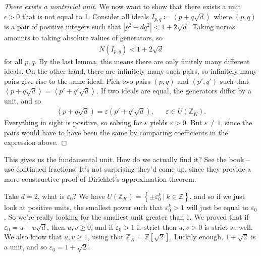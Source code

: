 \begin{proof}[There exists a nontrivial unit]

We now want to show that there exists a unit \(\epsilon>0\) that is not
equal to 1. Consider all ideals
\(I_{p, q} \coloneqq\left\langle{ p + q \sqrt{d} }\right\rangle\) where
\((p, q)\) is a pair of positive integers such that
\({\left\lvert {p^2 - dq^2} \right\rvert} < 1 + 2 \sqrt{d}\). Taking
norms amounts to taking absolute values of generators, so
\begin{align*}
N(I_{p, q} ) < 1 + 2 \sqrt{d}
\end{align*}
for all \(p, q\). By the last lemma, this means there are only finitely
many different ideals. On the other hand, there are infinitely many such
pairs, so infinitely many pairs give rise to the same ideal. Pick two
pairs \((p, q)\) and \((p', q')\) such that
\(\left\langle{ p + q \sqrt{d} }\right\rangle = \left\langle{ p' + q' \sqrt{d} }\right\rangle\).
If two ideals are equal, the generators differ by a unit, and so
\begin{align*}
(p + q \sqrt{d} ) = \varepsilon(p' + q' \sqrt{d} ), && \varepsilon\in U({\mathbb{Z}}_K)
.\end{align*}
Everything in sight is positive, so solving for \(\varepsilon\) yields
\(\varepsilon> 0\). But \(\varepsilon\neq 1\), since the pairs would
have to have been the same by comparing coefficients in the expression
above.

\end{proof}

\begin{remark}

This gives us the fundamental unit. How do we actually find it? See the
book -- use continued fractions! It's not surprising they'd come up,
since they provide a more constructive proof of Dirichlet's
approximation theorem.

\end{remark}

\begin{example}

Take \(d=2\), what is \(\varepsilon_0\)? We have
\(U({\mathbb{Z}}_K) = \left\{{ \pm \varepsilon_0 ^k {~\mathrel{\Big|}~}k\in {\mathbb{Z}}}\right\}\),
and so if we just look at positive units, the smallest power such that
\(\varepsilon_0^k > 1\) will just be equal to \(\varepsilon_0\). So
we're really looking for the smallest unit greater than 1. We proved
that if \(\varepsilon_0 = u + v \sqrt{d}\), then \(u, v \geq 0\), and if
\(\varepsilon_0 > 1\) is strict then \(u, v > 0\) is strict as well. We
also know that \(u, v \geq 1\), using that
\({\mathbb{Z}}_K = {\mathbb{Z}}[\sqrt{2} ]\). Luckily enough,
\(1 + \sqrt{2}\) is a unit, and so \(\varepsilon_0 = 1 + \sqrt{2}\).

\end{example}

